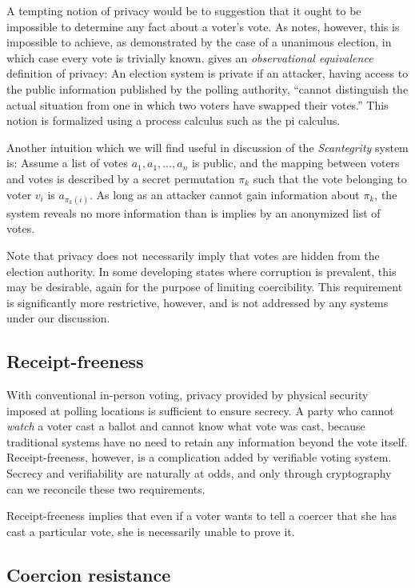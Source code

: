 \documentclass[10pt,twocolumn]{article}
\newcommand{\term}[1]{\textit{#1}}
\begin{document}
A tempting notion of privacy would be to suggestion that it ought to be impossible
to determine any fact about a voter's vote. As \cite{preta} notes, however,
this is impossible to achieve, as demonstrated by the case of a unanimous election,
in which case every vote is trivially known.
\cite{kremer} gives an \term{observational equivalence} definition of privacy:
An election system is private if an attacker, having access to the public
information published by the polling authority, ``cannot distinguish
the actual situation from one in which two voters have swapped their votes.''
This notion is formalized using a process calculus such as the pi calculus.

Another intuition which we will find useful in discussion of the \term{Scantegrity} system is:
Assume a list of votes $a_1, a_1, \ldots, a_n$ is public, and the mapping between
voters and votes is described by a secret permutation $\pi_k$ such that the vote
belonging to voter $v_i$ is $a_{\pi_k(i)}$.
As long as an attacker cannot gain information about $\pi_k$,
the system reveals no more information than is implies by an anonymized list of votes.

Note that privacy does not necessarily imply that votes are hidden from the election
authority. In some developing states where corruption is prevalent, this may be desirable,
again for the purpose of limiting coercibility.
This requirement is significantly more restrictive, however, and is not addressed by
any systems under our discussion.

\subsection{Receipt-freeness}

With conventional in-person voting, privacy provided by physical security imposed
at polling locations is sufficient to ensure secrecy.
A party who cannot \emph{watch} a voter cast a ballot and cannot know what vote
was cast, because traditional systems have no need to retain any information
beyond the vote itself.
Receipt-freeness, however, is a complication added by verifiable voting system.
Secrecy and verifiability are naturally at odds, and only through cryptography can we
reconcile these two requirements.

Receipt-freeness implies that even if a voter wants to tell a coercer that
she has cast a particular vote, she is necessarily unable to prove it.

\subsection{Coercion resistance}
\end{document}
